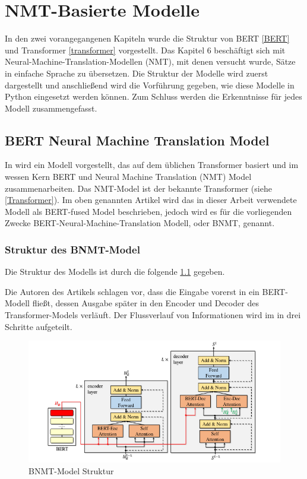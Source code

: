 \chapter{NMT-Basierte Modelle}

In den zwei vorangegangenen Kapiteln wurde die Struktur von BERT \ref{BERT} und Transformer \ref{transformer} vorgestellt. Das Kapitel 6 beschäftigt sich mit Neural-Machine-Translation-Modellen (NMT), mit denen versucht wurde, Sätze in einfache Sprache zu übersetzen. Die Struktur der Modelle wird zuerst dargestellt und anschließend wird die Vorführung gegeben, wie diese Modelle in Python eingesetzt werden können. Zum Schluss werden die Erkenntnisse für jedes Modell zusammengefasst.

\section{BERT Neural Machine Translation Model}
In \cite{NMT:20} wird ein Modell vorgestellt, das auf dem üblichen Transformer basiert und im wessen Kern BERT und Neural Machine Translation (NMT) Model zusammenarbeiten. Das NMT-Model ist der bekannte Transformer (siehe \cref{Transformer}). Im oben genannten Artikel wird das in dieser Arbeit verwendete Modell als BERT-fused Model beschrieben, jedoch wird es für die vorliegenden Zwecke BERT-Neural-Machine-Translation Modell, oder BNMT, genannt.

\subsection{Struktur des BNMT-Model}\label{sec:BNMT_Model}
Die Struktur des Modells ist durch die folgende \cref{bnmt_model_figure} gegeben.

Die Autoren des Artikels \cite{NMT:2017} schlagen vor, dass die Eingabe vorerst in ein BERT-Modell fließt, dessen Ausgabe später in den Encoder und Decoder des Transformer-Models verläuft. Der Flussverlauf von Informationen wird im \cite{NMT:20} in drei Schritte aufgeteilt.

\begin{figure}[H]
	\centering
	\includegraphics[scale=0.7]{images/BNMT-Model.png}
	\caption{BNMT-Model Struktur \cite{NMT:20}}
	\label{bnmt_model_figure}
\end{figure}

